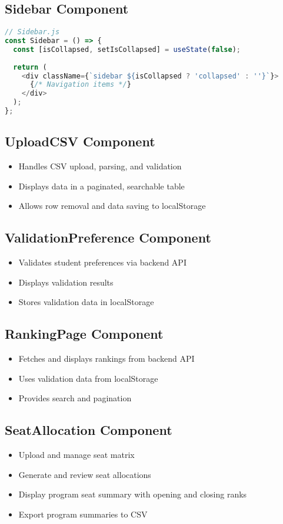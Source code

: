 \documentclass[12pt,a4paper]{article}
\begin{document}
\subsection{Sidebar Component}
\begin{lstlisting}[language=JavaScript]
// Sidebar.js
const Sidebar = () => {
  const [isCollapsed, setIsCollapsed] = useState(false);
  
  return (
    <div className={`sidebar ${isCollapsed ? 'collapsed' : ''}`}>
      {/* Navigation items */}
    </div>
  );
};
\end{lstlisting}

\subsection{UploadCSV Component}
\begin{itemize}
    \item Handles CSV upload, parsing, and validation
    \item Displays data in a paginated, searchable table
    \item Allows row removal and data saving to localStorage
\end{itemize}

\subsection{ValidationPreference Component}
\begin{itemize}
    \item Validates student preferences via backend API
    \item Displays validation results
    \item Stores validation data in localStorage
\end{itemize}

\subsection{RankingPage Component}
\begin{itemize}
    \item Fetches and displays rankings from backend API
    \item Uses validation data from localStorage
    \item Provides search and pagination
\end{itemize}

\subsection{SeatAllocation Component}
\begin{itemize}
    \item Upload and manage seat matrix
    \item Generate and review seat allocations
    \item Display program seat summary with opening and closing ranks
    \item Export program summaries to CSV
\end{itemize}
\end{document}
